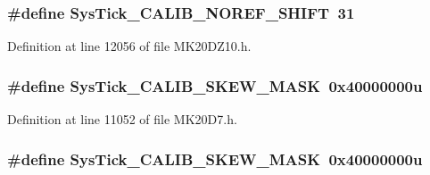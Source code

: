 \subsubsection[{\texorpdfstring{Sys\+Tick\+\_\+\+C\+A\+L\+I\+B\+\_\+\+N\+O\+R\+E\+F\+\_\+\+S\+H\+I\+FT}{SysTick_CALIB_NOREF_SHIFT}}]{\setlength{\rightskip}{0pt plus 5cm}\#define Sys\+Tick\+\_\+\+C\+A\+L\+I\+B\+\_\+\+N\+O\+R\+E\+F\+\_\+\+S\+H\+I\+FT~31}\hypertarget{group___sys_tick___register___masks_ga957057ddf04b20227820b1343b08a302}{}\label{group___sys_tick___register___masks_ga957057ddf04b20227820b1343b08a302}


Definition at line 12056 of file M\+K20\+D\+Z10.\+h.

\subsubsection[{\texorpdfstring{Sys\+Tick\+\_\+\+C\+A\+L\+I\+B\+\_\+\+S\+K\+E\+W\+\_\+\+M\+A\+SK}{SysTick_CALIB_SKEW_MASK}}]{\setlength{\rightskip}{0pt plus 5cm}\#define Sys\+Tick\+\_\+\+C\+A\+L\+I\+B\+\_\+\+S\+K\+E\+W\+\_\+\+M\+A\+SK~0x40000000u}\hypertarget{group___sys_tick___register___masks_gaade570cf5b9c0a8da6e1215de8db8d82}{}\label{group___sys_tick___register___masks_gaade570cf5b9c0a8da6e1215de8db8d82}


Definition at line 11052 of file M\+K20\+D7.\+h.

\subsubsection[{\texorpdfstring{Sys\+Tick\+\_\+\+C\+A\+L\+I\+B\+\_\+\+S\+K\+E\+W\+\_\+\+M\+A\+SK}{SysTick_CALIB_SKEW_MASK}}]{\setlength{\rightskip}{0pt plus 5cm}\#define Sys\+Tick\+\_\+\+C\+A\+L\+I\+B\+\_\+\+S\+K\+E\+W\+\_\+\+M\+A\+SK~0x40000000u}\hypertarget{group___sys_tick___register___masks_gaade570cf5b9c0a8da6e1215de8db8d82}{}\label{group___sys_tick___register___masks_gaade570cf5b9c0a8da6e1215de8db8d82}


